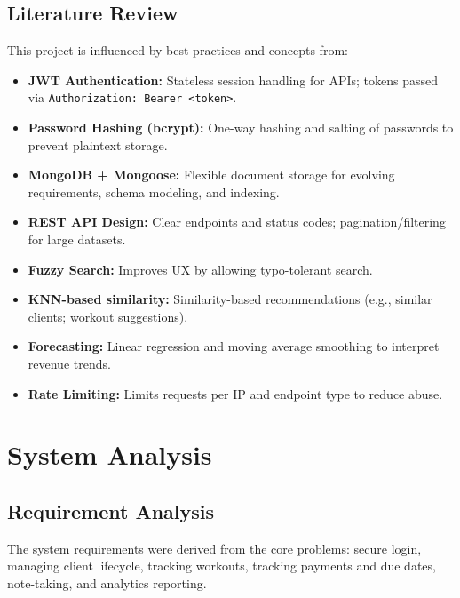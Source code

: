 \documentclass[12pt,a4paper]{report}
\begin{document}
\section{Literature Review}
This project is influenced by best practices and concepts from:
\begin{itemize}[leftmargin=*]
  \item \textbf{JWT Authentication:} Stateless session handling for APIs; tokens passed via \texttt{Authorization: Bearer <token>}.
  \item \textbf{Password Hashing (bcrypt):} One-way hashing and salting of passwords to prevent plaintext storage.
  \item \textbf{MongoDB + Mongoose:} Flexible document storage for evolving requirements, schema modeling, and indexing.
  \item \textbf{REST API Design:} Clear endpoints and status codes; pagination/filtering for large datasets.
  \item \textbf{Fuzzy Search:} Improves UX by allowing typo-tolerant search.
  \item \textbf{KNN-based similarity:} Similarity-based recommendations (e.g., similar clients; workout suggestions).
  \item \textbf{Forecasting:} Linear regression and moving average smoothing to interpret revenue trends.
  \item \textbf{Rate Limiting:} Limits requests per IP and endpoint type to reduce abuse.
\end{itemize}

\chapter{System Analysis}
\section{Requirement Analysis}
The system requirements were derived from the core problems: secure login, managing client lifecycle, tracking workouts, tracking payments and due dates, note-taking, and analytics reporting.
\end{document}

